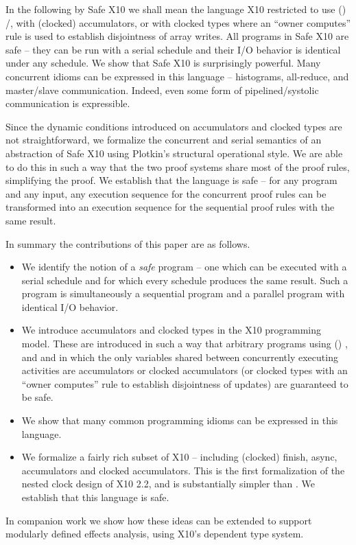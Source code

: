 In the following by Safe X10 we shall mean the language X10 restricted
to use () /,  with
(clocked) accumulators, or with clocked types where an ``owner
computes'' rule is used to establish disjointness of array writes.
 All programs in Safe X10 are safe -- they can
be run with a serial schedule and their I/O behavior is identical
under any schedule.  We show that Safe X10 is surprisingly
powerful. Many concurrent idioms can be expressed in this language --
histograms, all-reduce, and master/slave communication.
Indeed, even some
form of pipelined/systolic communication is expressible.

Since the dynamic conditions introduced on accumulators and clocked
types are not straightforward, we formalize the concurrent and serial
semantics of an abstraction of Safe X10 using Plotkin's structural
operational style. We are able to do this in such a way that the two
proof systems share most of the proof rules, simplifying the proof. We
establish that the language is safe -- for any program and any input,
any execution sequence for the concurrent proof rules can be
transformed into an execution sequence for the sequential proof rules
with the same result.

In summary the contributions of this paper are as follows.

\begin{itemize}
\item We identify the notion of a {\em safe} program -- one which can
  be executed with a serial schedule and for which
  every schedule produces the same result. Such a program is
  simultaneously a sequential program and a parallel program with
  identical I/O behavior.
\item We introduce accumulators and clocked types in the X10
  programming model. These are introduced in such a way that arbitrary
  programs using () ,  and
   and in which the only variables shared between
  concurrently executing activities are accumulators or clocked
  accumulators (or clocked types with an ``owner computes'' rule to
  establish disjointness of updates) are guaranteed to be safe.
\item We show that many common programming idioms can be expressed in
  this language.
\item We formalize a fairly rich subset of X10 -- including (clocked)
  finish, async, accumulators and clocked accumulators.  This is the
  first formalization of the nested clock design of X10 2.2, and is
  substantially simpler than \cite{vj-clock}. We establish that this
  language is safe.
\end{itemize}
In companion work we show how these ideas can be extended to support
modularly defined effects analysis, using X10's dependent type system.

